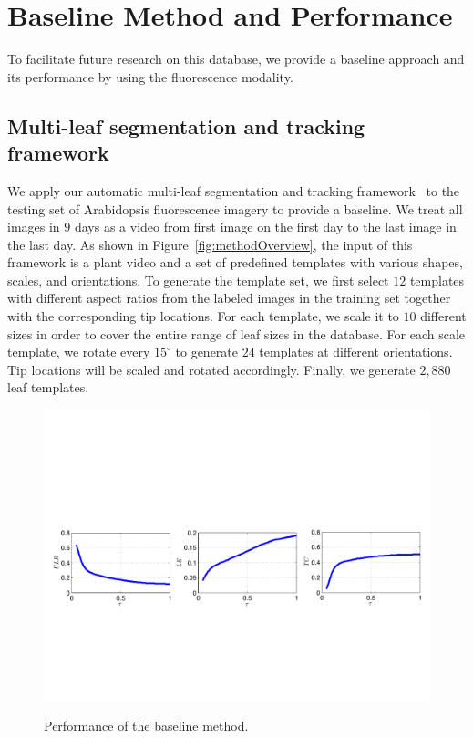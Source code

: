 \section{Baseline Method and Performance}
\label{sec:baseline}

To facilitate future research on this database, we provide a baseline approach and its performance by using the fluorescence modality.

\subsection{Multi-leaf segmentation and tracking framework}
We apply our automatic multi-leaf segmentation and tracking framework~\cite{yin2014a,yin2014b} to the testing set of Arabidopsis fluorescence imagery to provide a baseline.
We treat all images in $9$ days as a video from first image on the first day to the last image in the last day. 
As shown in Figure~\ref{fig:methodOverview}, the input of this framework is a plant video and a set of predefined templates with various shapes, scales, and orientations.
To generate the template set, we first select $12$ templates with different aspect ratios from the labeled images in the training set together with the corresponding tip locations.
For each template, we scale it to $10$ different sizes in order to cover the entire range of leaf sizes in the database.
For each scale template, we rotate every $15^{\circ}$ to generate $24$ templates at different orientations.
Tip locations will be scaled and rotated accordingly.
Finally, we generate $2,880$ leaf templates.

\begin{figure}
\centering
\includegraphics[width=.98\textwidth]{Figures/performance}\\
\caption{Performance of the baseline method.}
\label{fig:performance}
\end{figure}

